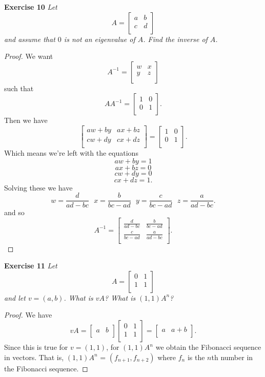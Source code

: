 \documentclass{article}
\begin{document}
\begin{flushleft}
\textbf{Exercise 10}
\textsl{Let
\[
A=
\left [
\begin{array}{cc}
a & b\\
c & d\\
\end{array}
\right ]
\]
and assume that $0$ is not an eigenvalue of $A$. Find the inverse of $A$.}
\begin{proof}
We want
\[
A^{-1} =
\left [
\begin{array}{cc}
w & x\\
y & z\\
\end{array}
\right ]
\]
such that
\[
AA^{-1} =
\left [
\begin{array}{cc}
1 & 0\\
0 & 1\\
\end{array}
\right ].
\]
Then we have
\[
\left [
\begin{array}{cc}
aw+by & ax+bz\\
cw+dy & cx+dz\\
\end{array}
\right ]
=
\left [
\begin{array}{cc}
1 & 0\\
0 & 1\\
\end{array}
\right ].
\]
Which means we're left with the equations
\[
aw+by = 1
\]
\[
ax+bz = 0
\]
\[
cw+dy = 0
\]
\[
cx+dz = 1.
\]
Solving these we have
\[
w = \frac{d}{ad-bc} \text{ } x = \frac{b}{bc-ad} \text{ } y = \frac{c}{bc-ad} \text{ } z = \frac{a}{ad-bc}.
\]
and so
\[
A^{-1} =
\left [
\begin{array}{cc}
\frac{d}{ad-bc} & \frac{b}{bc-ad}\\
\frac{c}{bc-ad} & \frac{a}{ad-bc}\\
\end{array}
\right ].
\]
\end{proof}

\textbf{Exercise 11}
\textsl{Let
\[
A=
\left [
\begin{array}{cc}
0 & 1\\
1 & 1\\
\end{array}
\right ]
\]
and let $v = (a,b)$. What is $vA$? What is $(1,1)A^n$?}
\begin{proof}
We have
\[
vA=
\left [
\begin{array}{cc}
a & b\\
\end{array}
\right ]
\left [
\begin{array}{cc}
0 & 1\\
1 & 1\\
\end{array}
\right ]
=
\left [
\begin{array}{cc}
a & a+b\\
\end{array}
\right ].
\]
Since this is true for $v = (1,1)$, for $(1,1)A^n$ we obtain the Fibonacci sequence in vectors. That is, $(1,1) A^n$ = $(f_{n+1}, f_{n+2})$ where $f_n$ is the $n$th number in the Fibonacci sequence.
\end{proof}

\end{flushleft}
\end{document}
